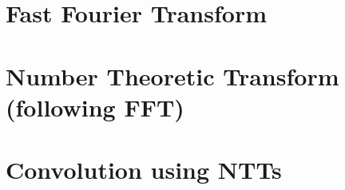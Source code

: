 \documentclass{article}
\begin{document}
 
 
 

\section{Fast Fourier Transform}
 
 
 

\section{Number Theoretic Transform (following FFT)}

\section{Convolution using NTTs}
\end{document}
